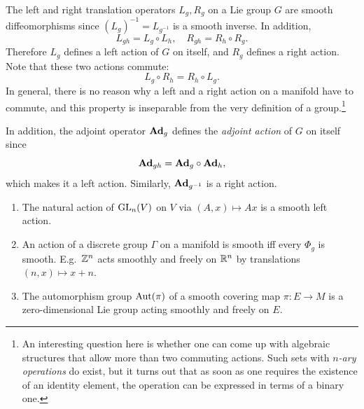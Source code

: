 \begin{example}
    The left and right translation operators $L_g,R_g$ on a Lie group $G$ are smooth diffeomorphisms since $(L_g)^{-1}=L_{g^{-1}}$ is a smooth inverse. In addition,
    \[L_{gh}=L_g\circ L_h,\quad R_{gh}=R_h\circ R_g.\]
    Therefore $L_g$ defines a left action of $G$ on itself, and $R_g$ defines a right action. Note that these two actions commute: 
    \[L_g\circ R_h=R_h\circ L_g.\]
    In general, there is no reason why a left and a right action on a manifold have to commute, and this property is inseparable from the very definition of a group.\footnote{An interesting question here is whether one can come up with algebraic structures that allow more than two commuting actions. Such sets with \emph{$n$-ary operations} do exist, but it turns out that as soon as one requires the existence of an identity element, the operation can be expressed in terms of a binary one.}

    In addition, the adjoint operator $\mathrm{\mathbf{Ad}}_g$ defines the \emph{adjoint action} of $G$ on itself since 
    \[\mathrm{\mathbf{Ad}}_{gh}=\mathrm{\mathbf{Ad}}_g\circ \mathrm{\mathbf{Ad}}_h,\]
    which makes it a left action. Similarly, $\mathrm{\mathbf{Ad}}_{g^{-1}}$ is a right action.
\end{example}

\begin{example}
    \begin{enumerate}[label=(\alph*)]
        \item The natural action of $\operatorname{GL}_n(V)$ on $V$ via $(A,x)\mapsto Ax$ is a smooth left action.
        \item An action of a discrete group $\Gamma$ on a manifold is smooth iff every $\Phi_g$ is smooth. E.g.~$\mathbb{Z}^n$ acts smoothly and freely on $\mathbb{R}^n$ by translations $(n,x)\mapsto x+n$.
        \item The automorphism group $\operatorname{Aut}(\pi)$ of a smooth covering map $\pi:E\to M$ is a zero-dimensional Lie group acting smoothly and freely on $E$.
    \end{enumerate}
\end{example}

